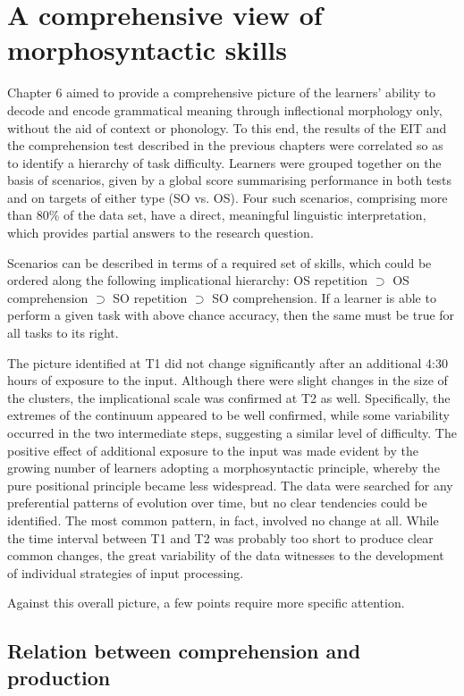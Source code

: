 \section{A comprehensive view of morphosyntactic skills}\label{sec:08:4}

Chapter 6 aimed to provide a comprehensive picture of the learners’ ability to decode and encode grammatical meaning through inflectional morphology only, without the aid of context or phonology. To this end, the results of the EIT and the comprehension test described in the previous chapters were correlated so as to identify a hierarchy of task difficulty. Learners were grouped together on the basis of scenarios, given by a global score summarising performance in both tests and on targets of either type (SO vs. OS). Four such scenarios, comprising more than 80\% of the data set, have a direct, meaningful linguistic interpretation, which provides partial answers to the research question. 

Scenarios can be described in terms of a required set of skills, which could be ordered along the following implicational hierarchy: OS repetition ${\supset}$ OS comprehension ${\supset}$ SO repetition ${\supset}$ SO comprehension. If a learner is able to perform a given task with above chance accuracy, then the same must be true for all tasks to its right. 

The picture identified at T1 did not change significantly after an additional 4:30 hours of exposure to the input. Although there were slight changes in the size of the clusters, the implicational scale was confirmed at T2 as well. Specifically, the extremes of the continuum appeared to be well confirmed, while some variability occurred in the two intermediate steps, suggesting a similar level of difficulty. The positive effect of additional exposure to the input was made evident by the growing number of learners adopting a morphosyntactic principle, whereby the pure positional principle became less widespread. The data were searched for any preferential patterns of evolution over time, but no clear tendencies could be identified. The most common pattern, in fact, involved no change at all. While the time interval between T1 and T2 was probably too short to produce clear common changes, the great variability of the data witnesses to the development of individual strategies of input processing.

Against this overall picture, a few points require more specific attention. 

\subsection{Relation between comprehension and production}\label{sec:08:4.1}


